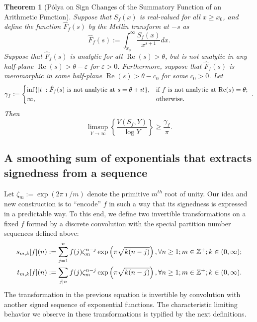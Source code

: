\documentclass[11pt,reqno]{amsart}
\numberwithin{figure}{section}
\numberwithin{table}{section}
\renewcommand{\Re}{\operatorname{Re}}
\theoremstyle{plain}
\newtheorem{theorem}{Theorem}
\numberwithin{theorem}{section}
\theoremstyle{definition}
\begin{document}
\begin{theorem}[P\'olya on Sign Changes of the Summatory Function of an Arithmetic Function] 
Suppose that $S_f(x)$ is real-valued for all $x \geq x_0$, and define the function 
$\hat{F}_f(s)$ by the Mellin transform at $-s$ as 
\[
\hat{F}_f(s) := \int_{x_0}^{\infty} \frac{S_f(x)}{x^{s+1}} dx. 
\]
Suppose that $\hat{F}_f(s)$ is analytic for all $\Re(s) > \theta$, but is not analytic 
in any half-plane $\Re(s) > \theta - \varepsilon$ for $\varepsilon > 0$. 
Furthermore, suppose that $\hat{F}_f(s)$ is meromorphic in some half-plane 
$\Re(s) > \theta - c_0$ for some $c_0 > 0$. Let 
\[
\gamma_f := \begin{cases} 
     \inf \{|t|: \hat{F}_f(s) \text{\ is not analytic at\ } s = \theta+\imath t\}, & \text{\rm
     if $f$ is not analytic at $\Re(s) = \theta$; } \\ 
     \infty, & \text{\rm otherwise.}
     \end{cases}. 
 \]
 Then 
 \[
 \limsup_{Y \rightarrow \infty} \left\{\frac{V(S_f, Y)}{\log Y}\right\} \geq \frac{\gamma_f}{\pi}. 
\]
\end{theorem} 

\subsection{A smoothing sum of exponentials that extracts signedness from a sequence} 

Let $\zeta_m := \exp(2\pi\imath / m)$ denote the primitive $m^{th}$ root of unity. 
Our idea and new construction is to ``encode'' $f$ in such a way that its signedness is expressed in a 
predictable way. To this end, we define two invertible transformations on a fixed $f$ formed by a 
discrete convolution with the special partition number sequences defined above: 
\begin{align} 
\label{eqn_sfn_tfn_SignSmoothingByExpFuncSumsFuncs_intro_v1}
s_{m,k}[f](n) & := \sum_{j=1}^{n} f(j) \zeta_m^{n-j} \exp\left(\pi \sqrt{k(n-j)}\right), 
     \forall n \geq 1; m \in \mathbb{Z}^{+}; k \in (0, \infty); \\ 
\notag 
t_{m,k}[f](n) & := \sum_{j|n} f(j) \zeta_m^{n-j} \exp\left(\pi \sqrt{k(n-j)}\right), 
     \forall n \geq 1; m \in \mathbb{Z}^{+}; k \in (0, \infty).
\end{align} 
The transformation in the previous equation is invertible by convolution with another signed 
sequence of exponential functions. 
The characteristic limiting behavior we observe in these 
transformations is typified by the next definitions. 
\end{document}

